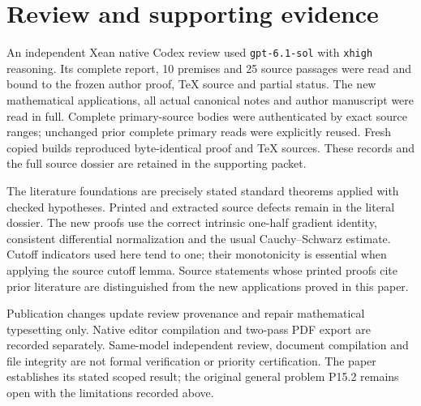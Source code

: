 \documentclass[
  10pt,
]{article}
\begin{document}
\section*{Review and supporting evidence}

An independent Xean native Codex review used \texttt{gpt-6.1-sol} with
\texttt{xhigh} reasoning. Its complete report, 10 premises and
25 source passages were read and bound to the frozen author
proof, TeX source and partial status. The new mathematical applications,
all actual canonical notes and author manuscript were read in full.
Complete primary-source bodies were authenticated by exact source ranges;
unchanged prior complete primary reads were explicitly reused. Fresh copied
builds reproduced byte-identical proof and TeX sources. These records and
the full source dossier are retained in the supporting packet.

The literature foundations are precisely stated standard theorems applied
with checked hypotheses. Printed and extracted source defects remain in
the literal dossier. The new proofs use the correct intrinsic one-half
gradient identity, consistent differential normalization and the usual
Cauchy--Schwarz estimate. Cutoff indicators used here tend to one; their
monotonicity is essential when applying the source cutoff lemma. Source
statements whose printed proofs cite prior literature are distinguished
from the new applications proved in this paper.

Publication changes update review provenance and repair mathematical
typesetting only. Native editor compilation and two-pass PDF export are
recorded separately. Same-model independent review, document compilation
and file integrity are not formal verification or priority certification.
The paper establishes its stated scoped result; the original general
problem P15.2 remains open with the limitations recorded above.
\end{document}
